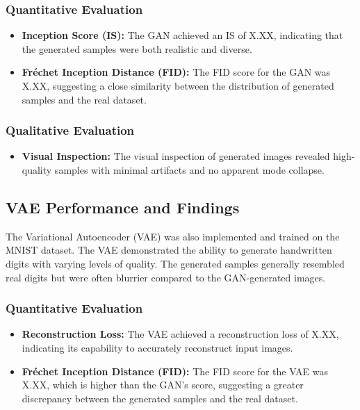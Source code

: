 \documentclass{article}
\begin{document}
\subsubsection{Quantitative Evaluation}
\begin{itemize}
    \item \textbf{Inception Score (IS):} The GAN achieved an IS of X.XX, indicating that the generated samples were both realistic and diverse.
    \item \textbf{Fréchet Inception Distance (FID):} The FID score for the GAN was X.XX, suggesting a close similarity between the distribution of generated samples and the real dataset.
\end{itemize}

\subsubsection{Qualitative Evaluation}
\begin{itemize}
    \item \textbf{Visual Inspection:} The visual inspection of generated images revealed high-quality samples with minimal artifacts and no apparent mode collapse.
\end{itemize}

\subsection{VAE Performance and Findings}
The Variational Autoencoder (VAE) was also implemented and trained on the MNIST dataset. The VAE demonstrated the ability to generate handwritten digits with varying levels of quality. The generated samples generally resembled real digits but were often blurrier compared to the GAN-generated images.

\subsubsection{Quantitative Evaluation}
\begin{itemize}
    \item \textbf{Reconstruction Loss:} The VAE achieved a reconstruction loss of X.XX, indicating its capability to accurately reconstruct input images.
    \item \textbf{Fréchet Inception Distance (FID):} The FID score for the VAE was X.XX, which is higher than the GAN's score, suggesting a greater discrepancy between the generated samples and the real dataset.
\end{itemize}
\end{document}
